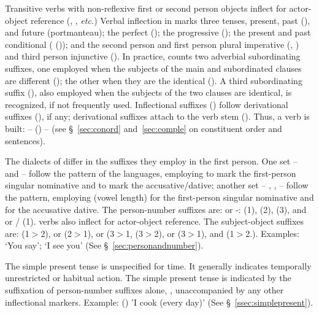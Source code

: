 Transitive verbs with non-reflexive first or second person objects inflect for actor-object reference (, , \emph{etc.}) Verbal inflection in \SYQ{} marks three tenses, present, past (), and future (portmanteau); the perfect (); the progressive (); the present and past conditional ( ()); and the second person and first person plural imperative (, ) and third person injunctive (). In practice, \SYQ{} counts two adverbial subordinating suffixes, one employed when the subjects of the main and subordinated clauses are different (); the other when they are the identical (). A third subordinating suffix (), also employed when the subjects of the two clauses are identical, is recognized, if not frequently used. Inflectional suffixes () follow derivational suffixes (), if any; derivational suffixes attach to the verb stem (). Thus, a \SYQ{} verb is built:  -- () --  (see \S~\ref{sec:conord} and~\ref{sec:comple} on constituent order and sentences).

The dialects of \SYQ{} differ in the suffixes they employ in the first person. One set -- \AMV{} and \LT{} -- follow the pattern of the \QII{} languages, employing  to mark the first-person singular nominative and  to mark the accusative/dative; another set -- \ACH{}, \SP{}, \CH{} -- follow the \QI{} pattern, employing \phono{-:} (vowel length) for the first-person singular nominative and  for the accusative dative. The person-number suffixes are:  or -: (1),  (2),  (3), and  or / \phono{-:} (1). \SYQ{} verbs also inflect for actor-object reference. The subject-object suffixes are:  (1$>$2),  or  (2$>$1),  or  (3$>$1,  (3$>$2),  or  (3$>$1), and  (1$>$2.). Examples:  `You say';  `I see you' (See \S~\ref{sec:personandnumber}).

The simple present tense is unspecified for time. It generally indicates temporally unrestricted or habitual action. The simple present tense is indicated by the suffixation of person-number suffixes alone, \ie{}, unaccompanied by any other inflectional markers. Example:  () 'I cook (every day)' (See \S~\ref{ssec:simplepresent}).

